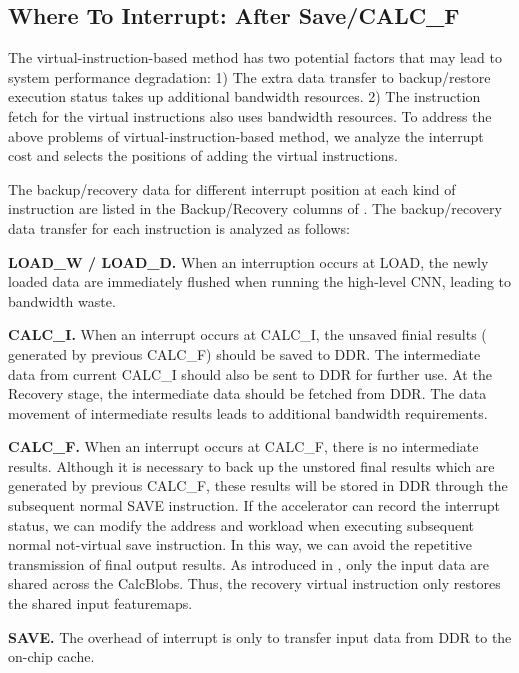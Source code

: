 \subsection{ Where To Interrupt: After Save/CALC\_F }
\label{sec:whereinter}
The virtual-instruction-based method has two potential factors that may lead to system performance degradation: 1) The extra data transfer to backup/restore execution status takes up additional bandwidth resources. 2) The instruction fetch for the virtual instructions also uses bandwidth resources.
To address the above problems of virtual-instruction-based method, we analyze the interrupt cost and selects the positions of adding the virtual instructions.

The backup/recovery data for different interrupt position at each kind of instruction are listed in the Backup/Recovery columns of . The backup/recovery data transfer for each instruction is analyzed as follows:

\textbf{LOAD\_W / LOAD\_D. }
When an interruption occurs at LOAD, the newly loaded data are immediately flushed when running the high-level CNN, leading to bandwidth waste.

\textbf{CALC\_I.} 
When an interrupt occurs at CALC\_I, the unsaved finial results ( generated by previous CALC\_F) should be saved to DDR. The intermediate data from current CALC\_I should also be sent to DDR for further use. At the Recovery stage, the intermediate data should be fetched from DDR. The data movement of intermediate results leads to additional bandwidth requirements.


\textbf{CALC\_F.}
When an interrupt occurs at CALC\_F, there is no intermediate results. 
Although it is necessary to back up the unstored final results which are generated by previous CALC\_F, these results will be stored in DDR through the subsequent normal SAVE instruction.
If the accelerator can record the interrupt status, we can modify the address and workload when executing subsequent normal not-virtual save instruction.
In this way, we can avoid the repetitive transmission of final output results.
As introduced in , only the input data are shared across the CalcBlobs. Thus, the recovery virtual instruction only restores the shared input featuremaps.



\textbf{SAVE.}
The overhead of interrupt is only to transfer input data from DDR to the on-chip cache. 

